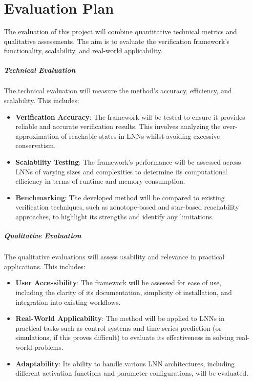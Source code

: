 \chapter{Evaluation Plan}

The evaluation of this project will combine quantitative technical metrics and qualitative assessments. The aim is to evaluate the verification framework's functionality, scalability, and real-world applicability.

\paragraph{Technical Evaluation}
The technical evaluation will measure the method's accuracy, efficiency, and scalability. This includes:
\begin{itemize}
    \item \textbf{Verification Accuracy}: The framework will be tested to ensure it provides reliable and accurate verification results. This involves analyzing the over-approximation of reachable states in LNNs whilst avoiding excessive conservatism.
    \item \textbf{Scalability Testing}: The framework's performance will be assessed across LNNs of varying sizes and complexities to determine its computational efficiency in terms of runtime and memory consumption.
    \item \textbf{Benchmarking}: The developed method will be compared to existing verification techniques, such as zonotope-based and star-based reachability approaches, to highlight its strengths and identify any limitations.
\end{itemize}

\paragraph{Qualitative Evaluation}
The qualitative evaluations will assess usability and relevance in practical applications. This includes:
\begin{itemize}
    \item \textbf{User Accessibility}: The framework will be assessed for ease of use, including the clarity of its documentation, simplicity of installation, and integration into existing workflows.
    \item \textbf{Real-World Applicability}: The method will be applied to LNNs in practical tasks such as control systems and time-series prediction (or simulations, if this proves difficult) to evaluate its effectiveness in solving real-world problems.
    \item \textbf{Adaptability}: Its ability to handle various LNN architectures, including different activation functions and parameter configurations, will be evaluated.
\end{itemize}

